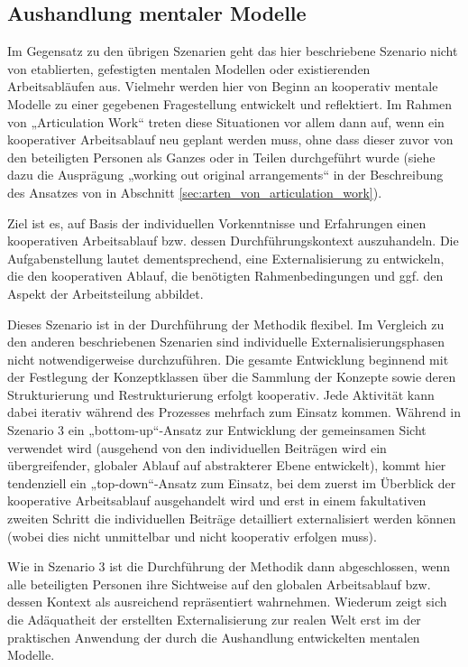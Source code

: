 
\subsection{Aushandlung mentaler Modelle} %
\label{sub:aushandlung_individueller_mentaler_modelle}

Im Gegensatz zu den übrigen Szenarien geht das hier beschriebene Szenario nicht von etablierten, gefestigten mentalen Modellen oder existierenden Arbeitsabläufen aus. Vielmehr werden hier von Beginn an kooperativ mentale Modelle zu einer gegebenen Fragestellung entwickelt und reflektiert. Im Rahmen von „Articulation Work“ treten diese Situationen vor allem dann auf, wenn ein kooperativer Arbeitsablauf neu geplant werden muss, ohne dass dieser zuvor von den beteiligten Personen als Ganzes oder in Teilen durchgeführt wurde (siehe dazu die Ausprägung „working out original arrangements“ in der Beschreibung des Ansatzes von \citet{Corbin93} in Abschnitt \ref{sec:arten_von_articulation_work}). 

Ziel ist es, auf Basis der individuellen Vorkenntnisse und Erfahrungen einen kooperativen Arbeitsablauf bzw. dessen Durchführungskontext auszuhandeln. Die Aufgabenstellung lautet dementsprechend, eine Externalisierung zu entwickeln, die den kooperativen Ablauf, die benötigten Rahmenbedingungen und ggf. den Aspekt der Arbeitsteilung abbildet. 

Dieses Szenario ist in der Durchführung der Methodik flexibel. Im Vergleich zu den anderen beschriebenen Szenarien sind individuelle Externalisierungsphasen nicht notwendigerweise durchzuführen. Die gesamte Entwicklung beginnend mit der Festlegung der Konzeptklassen über die Sammlung der Konzepte sowie deren Strukturierung und Restrukturierung erfolgt kooperativ. Jede Aktivität kann dabei iterativ während des Prozesses mehrfach zum Einsatz kommen. Während in Szenario 3 ein „bottom-up“-Ansatz zur Entwicklung der gemeinsamen Sicht verwendet wird (ausgehend von den individuellen Beiträgen wird ein übergreifender, globaler Ablauf auf abstrakterer Ebene entwickelt), kommt hier tendenziell ein „top-down“-Ansatz zum Einsatz, bei dem zuerst im Überblick der kooperative Arbeitsablauf ausgehandelt wird und erst in einem fakultativen zweiten Schritt die individuellen Beiträge detailliert externalisiert werden können (wobei dies nicht unmittelbar und nicht kooperativ erfolgen muss).

Wie in Szenario 3 ist die Durchführung der Methodik dann abgeschlossen, wenn alle beteiligten Personen ihre Sichtweise auf den globalen Arbeitsablauf bzw. dessen Kontext als ausreichend repräsentiert wahrnehmen. Wiederum zeigt sich die Adäquatheit der erstellten Externalisierung zur realen Welt erst im der praktischen Anwendung der durch die Aushandlung entwickelten mentalen Modelle. 

